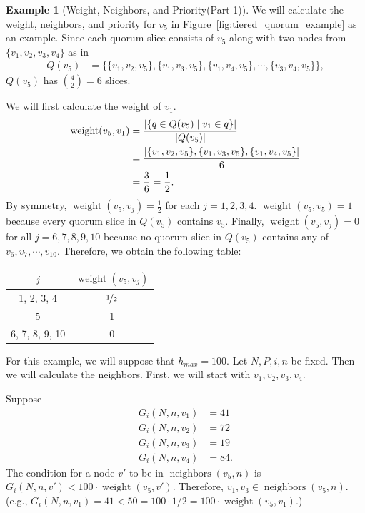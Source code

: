 \documentclass[12pt, psamsfonts]{amsart}
\theoremstyle{definition}
\newtheorem{exmp}[thm]{Example}
\theoremstyle{remark}
\DeclareMathOperator{\weight}{weight}
\DeclareMathOperator{\neighbors}{neighbors}
\numberwithin{equation}{subsection}
\begin{document}
\begin{exmp}[Weight, Neighbors, and Priority(Part 1)]
    We will calculate the weight, neighbors, and priority for $v_5$ in Figure~\ref{fig:tiered_quorum_example} as an example.
    Since each quorum slice consists of $v_5$ along with two nodes from $\{ v_1, v_2, v_3, v_4 \}$ as in
    \begin{align*}
        Q(v_5) &= \{ \{ v_1, v_2, v_5 \}, \{ v_1, v_3, v_5 \}, \{ v_1, v_4, v_5 \}, \cdots, \{ v_3, v_4, v_5 \} \},
    \end{align*}
    $Q(v_5)$ has $\binom{4}{2} = 6$ slices.

    We will first calculate the weight of $v_1$.
    \begin{align*}
        \weight(v_5, v_1)
            &= \frac{\abs{\{ q \in Q(v_5) \mid v_1 \in q \}}}{\abs{Q(v_5)}} \\
            &= \frac{\abs{ \{ v_1, v_2, v_5 \}, \{ v_1, v_3, v_5 \}, \{ v_1, v_4, v_5 \}}}{6} \\
            &= \frac{3}{6} = \frac{1}{2}.
    \end{align*}
    By symmetry, $\weight(v_5, v_j) = \frac{1}{2}$ for each $j = 1, 2, 3, 4$.
    $\weight(v_5, v_5) = 1$ because every quorum slice in $Q(v_5)$ contains $v_5$.
    Finally, $\weight(v_5, v_j) = 0$ for all $j = 6, 7, 8, 9, 10$ because no quorum slice in $Q(v_5)$ contains any of $v_6, v_7, \cdots, v_{10}$.
    Therefore, we obtain the following table:
    \begin{center}
      \begin{tabular}{ | c | c | }
        \hline
          $j$ & $\weight(v_5, v_j)$ \\ \hline
          1, 2, 3, 4 & $\nicefrac{1}{2}$ \\ \hline 
          5 & 1 \\ \hline 
          6, 7, 8, 9, 10 & 0 \\
        \hline
      \end{tabular}
    \end{center}

    For this example, we will suppose that $h_{max} = 100$.
    Let $N, P, i, n$ be fixed.
    Then we will calculate the neighbors.
    First, we will start with $v_1, v_2, v_3, v_4$.

    Suppose
    \begin{align*}
        G_i(N, n, v_1) &= 41 \\
        G_i(N, n, v_2) &= 72 \\
        G_i(N, n, v_3) &= 19 \\
        G_i(N, n, v_4) &= 84.
    \end{align*}
    The condition for a node $v'$ to be in $\neighbors(v_5, n)$ is $G_i(N, n, v') < 100 \cdot \weight(v_5, v')$.
    Therefore, $v_1, v_3 \in \neighbors(v_5, n)$.
    (e.g., $G_i(N, n, v_1) = 41 < 50 = 100 \cdot 1/2 = 100 \cdot \weight(v_5, v_1)$.)


\end{exmp}
\end{document}
